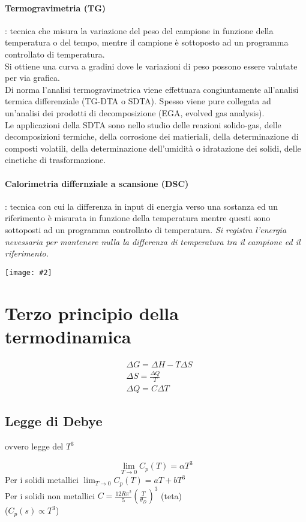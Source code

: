 \documentclass{article}
\newcommand{\img}[2]
{
\begin{center}
    \texttt{[image: \#2]}
\end{center}
}
\begin{document}
\paragraph{Termogravimetria (TG)}: tecnica che misura la variazione del peso del campione in funzione della temperatura o del tempo, mentre il campione è sottoposto ad un programma controllato di temperatura. \\ 
Si ottiene una curva a gradini dove le variazioni di peso possono essere valutate per via grafica. \\
Di norma l'analisi termogravimetrica viene effettuara congiuntamente all'analisi termica differenziale (TG-DTA o SDTA). Spesso viene pure collegata ad un'analisi dei prodotti di decomposizione (EGA, evolved gas analysis).\\
Le applicazioni della SDTA sono nello studio delle reazioni solido-gas, delle decomposizioni termiche, della corrosione dei matieriali, della determinazione di composti volatili, della determinazione dell'umidità o idratazione dei solidi, delle cinetiche di trasformazione.
\paragraph{Calorimetria differnziale a scansione (DSC)}: tecnica con cui la differenza in input di energia verso una sostanza ed un riferimento è misurata in funzione della temperatura mentre questi sono sottoposti ad un programma controllato di temperatura. \textit{Si registra l'energia nevessaria per mantenere nulla la differenza di temperatura tra il campione ed il riferimento.}

\img{10}{DSC.png}

\newpage

\section{Terzo principio della termodinamica}
\begin{align*}
        &\Delta G=\Delta H-T\Delta S \\
        &\Delta S=\frac{\Delta Q}{T}\\
        &\Delta Q =C\Delta T
\end{align*}
\subsection{Legge di Debye}
\begin{center}
    ovvero legge del $T^3$
\end{center}
\begin{equation*}
    \lim_{T\to0}C_p(T)=\alpha T^3
\end{equation*}
Per i solidi metallici $\lim_{T\to0}C_p(T)=aT+bT^3$\\
Per i solidi non metallici $C=\frac{12R\pi^2}{5}(\frac{T}{\theta_D})^3$ (\gls{teta})\\
($C_p(s)\propto T^3$)
\end{document}

